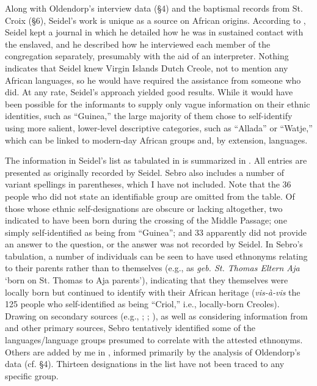 \documentclass[output=paper,colorlinks,citecolor=brown]{langscibook}
\begin{document}
Along with Oldendorp's interview data (§4) and the baptismal records from St. Croix (§6), Seidel's work is unique as a source on African origins. According to \citet[67--68]{Sebro_2010}, Seidel kept a journal in which he detailed how he was in sustained contact with the enslaved, and he described how he interviewed each member of the congregation separately, presumably with the aid of an interpreter. Nothing indicates that Seidel knew Virgin Islands Dutch Creole, not to mention any African languages, so he would have required the assistance from someone who did. At any rate, Seidel's approach yielded good results. While it would have been possible for the informants to supply only vague information on their ethnic identities, such as ``Guinea,'' the large majority of them chose to self-identify using more salient, lower-level descriptive categories, such as ``Allada'' or ``Watje,'' which can be linked to modern-day African groups and, by extension, languages.

The information in Seidel's list as tabulated in \citet[125--126]{Sebro_2010} is summarized in . All entries are presented as originally recorded by Seidel. Sebro also includes a number of variant spellings in parentheses, which I have not included. Note that the 36 people who did not state an identifiable group are omitted from the table. Of those whose ethnic self-designations are obscure or lacking altogether, two indicated to have been born during the crossing of the Middle Passage; one simply self-identified as being from ``Guinea''; and 33 apparently did not provide an answer to the question, or the answer was not recorded by Seidel. In Sebro's tabulation, a number of individuals can be seen to have used ethnonyms relating to their parents rather than to themselves (e.g., as \emph{geb. St. Thomas Eltern Aja} `born on St. Thomas to Aja parents'), indicating that they themselves were locally born but continued to identify with their African heritage (\emph{vis-\`a-vis} the 125 people who self-identified as being ``Criol,'' i.e., locally-born Creoles). Drawing on secondary sources (e.g., \cite{Thornton_1998}; \cite{Hall_2005}; \cite{Law2005}), as well as considering information from \citet{Oldendorp_2000, Oldendorp_2002} and other primary sources, Sebro tentatively identified some of the languages/language groups presumed to correlate with the attested ethnonyms. Others are added by me in , informed primarily by the analysis of Oldendorp's data (cf. §4). Thirteen designations in the list have not been traced to any specific group.
\end{document}
